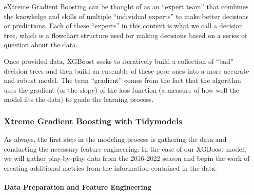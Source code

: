 \documentclass[
  letterpaper,
]{krantz}
\let\oldparagraph\paragraph
\renewcommand{\paragraph}[1]{\oldparagraph{#1}\mbox{}}
\begin{document}
eXtreme Gradient Boosting can be thought of as an ``expert team'' that
combines the knowledge and skills of multiple ``individual experts'' to
make better decisions or predictions. Each of these ``experts'' in this
context is what we call a decision tree, which is a flowchart structure
used for making decisions based on a series of question about the data.

Once provided data, XGBoost seeks to iteratively build a collection of
``bad'' decision trees and then build an ensemble of these poor ones
into a more accurate and robust model. The term ``gradient'' comes from
the fact that the algorithm uses the gradient (or the slope) of the loss
function (a measure of how well the model fits the data) to guide the
learning process.

\hypertarget{xtreme-gradient-boosting-with-tidymodels}{%
\subsubsection{Xtreme Gradient Boosting with
Tidymodels}\label{xtreme-gradient-boosting-with-tidymodels}}

As always, the first step in the modeling process is gathering the data
and conducting the necessary feature engineering. In the case of our
XGBoost model, we will gather play-by-play data from the 2016-2022
season and begin the work of creating additional metrics from the
information contained in the data.

\hypertarget{data-preparation-and-feature-engineering}{%
\paragraph{Data Preparation and Feature
Engineering}\label{data-preparation-and-feature-engineering}}
\end{document}
